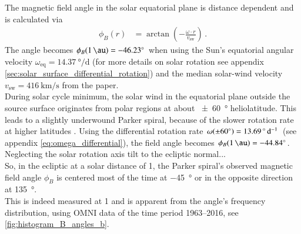 The magnetic field angle in the solar equatorial plane is distance dependent and is calculated via
\begin{align}
	\phi_B(r) &= \arctan\left(-\frac{\omega \cdot r}{v_\text{sw}}\right)\,.
\end{align}
The angle becomes $\phi_B(\SI{1}{\au}) = \SI{-46.23}{\degree}$ when using the Sun's equatorial angular velocity $\omega_\text{eq} = \SI{14.37}{\degree\per\day}$ (for more details on solar rotation see appendix \autoref{sec:solar_surface_differential_rotation}) and the median solar-wind velocity $v_\text{sw} = \SI{416}{\km\per\s}$ from the paper.\\

During solar cycle minimum, the solar wind in the equatorial plane outside the source surface originates from polar regions at about \SI{+-60}{\degree} heliolatitude. This leads to a slightly underwound Parker spiral, because of the slower rotation rate at higher latitudes \citep{Banaszkiewicz1998}. Using the differential rotation rate $\omega(\SI{+-60}{\degree}) = \SI{13.69}{\degree\per\day}$ (see appendix \autoref{eq:omega_differential}), the field angle becomes $\phi_B(\SI{1}{\au}) = \SI{-44.84}{\degree}$.\\

Neglecting the solar rotation axis tilt to the ecliptic normal...\\

So, in the ecliptic at a solar distance of \SI{1}{\au}, the Parker spiral's observed magnetic field angle $\phi_B$ is centered most of the time at \SI{-45}{\degree} or in the opposite direction at \SI{135}{\degree}.\\

This is indeed measured at \SI{1}{\au} and is apparent from the angle's frequency distribution, using OMNI data of the time period 1963--2016, see \autoref{fig:histogram_B_angles_b}.\\
\begin{figure}[htb]
\end{figure}

